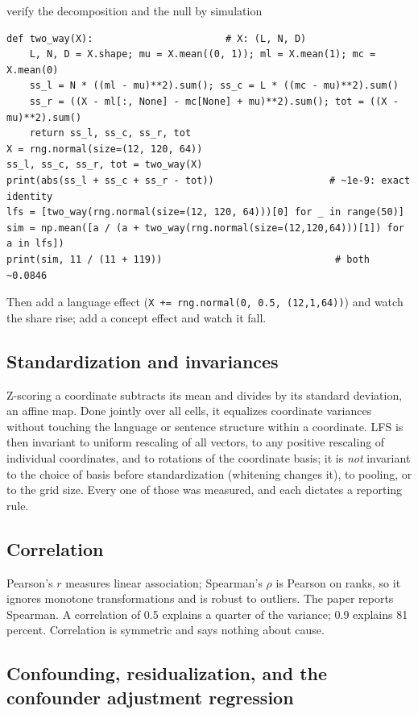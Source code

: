 \begin{exercise}{verify the decomposition and the null by simulation}
\begin{lstlisting}
def two_way(X):                       # X: (L, N, D)
    L, N, D = X.shape; mu = X.mean((0, 1)); ml = X.mean(1); mc = X.mean(0)
    ss_l = N * ((ml - mu)**2).sum(); ss_c = L * ((mc - mu)**2).sum()
    ss_r = ((X - ml[:, None] - mc[None] + mu)**2).sum(); tot = ((X - mu)**2).sum()
    return ss_l, ss_c, ss_r, tot
X = rng.normal(size=(12, 120, 64))
ss_l, ss_c, ss_r, tot = two_way(X)
print(abs(ss_l + ss_c + ss_r - tot))                    # ~1e-9: exact identity
lfs = [two_way(rng.normal(size=(12, 120, 64)))[0] for _ in range(50)]
sim = np.mean([a / (a + two_way(rng.normal(size=(12,120,64)))[1]) for a in lfs])
print(sim, 11 / (11 + 119))                              # both ~0.0846
\end{lstlisting}
Then add a language effect (\texttt{X += rng.normal(0, 0.5, (12,1,64))}) and
watch the share rise; add a concept effect and watch it fall.
\end{exercise}

\subsection{Standardization and invariances}

Z-scoring a coordinate subtracts its mean and divides by its standard
deviation, an affine map. Done jointly over all cells, it equalizes
coordinate variances without touching the language or sentence structure
within a coordinate. LFS is then invariant to uniform rescaling of all
vectors, to any positive rescaling of individual coordinates, and to
rotations of the coordinate basis; it is \emph{not} invariant to the choice
of basis before standardization (whitening changes it), to pooling, or to
the grid size. Every one of those was measured, and each dictates a
reporting rule.

\subsection{Correlation}

Pearson's $r$ measures linear association; Spearman's $\rho$ is Pearson on
ranks, so it ignores monotone transformations and is robust to outliers. The
paper reports Spearman. A correlation of 0.5 explains a quarter of the
variance; 0.9 explains 81 percent. Correlation is symmetric and says nothing
about cause.

\subsection{Confounding, residualization, and the confounder adjustment regression}

